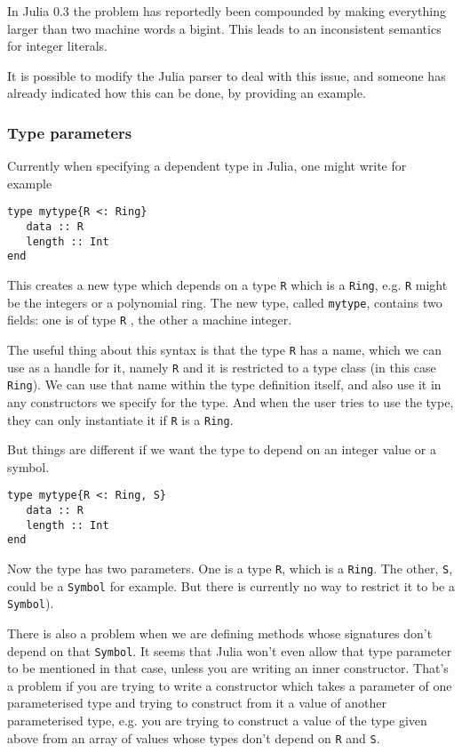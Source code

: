 \documentclass[a4paper,10pt]{article}
\newcommand{\code}{\lstinline}
\begin{document}
In Julia 0.3 the problem has reportedly been compounded by making everything larger than two machine
words a bigint. This leads to an inconsistent semantics for integer literals.

It is possible to modify the Julia parser to deal with this issue, and someone has already indicated
how this can be done, by providing an example.

\subsubsection{Type parameters}

Currently when specifying a dependent type in Julia, one might write for example

\begin{lstlisting}
type mytype{R <: Ring}
   data :: R
   length :: Int
end
\end{lstlisting}

This creates a new type which depends on a type \code{R} which is a \code{Ring}, e.g. \code{R}  might
be the integers or a polynomial ring. The new type, called \code{mytype}, contains two fields: one is
of type \code{R} , the other a machine integer.

The useful thing about this syntax is that the type \code{R}  has a name, which we can use as a handle for
it, namely \code{R} and it is restricted to a type class (in this case \code{Ring}). We can use that name 
within the type definition itself, and also use it in any constructors we specify for the type. And when
the user tries to use the type, they can only instantiate it if \code{R} is a \code{Ring}.

But things are different if we want the type to depend on an integer value or a symbol.

\begin{lstlisting}
type mytype{R <: Ring, S}
   data :: R
   length :: Int
end
\end{lstlisting}

Now the type has two parameters. One is a type \code{R}, which is a \code{Ring}. The other, \code{S}, 
could be a \code{Symbol} for example. But there is currently no way to restrict it to be a 
\code{Symbol}). 

There is also a problem when we are defining methods whose signatures don't depend on that
\code{Symbol}. It seems that Julia won't even allow that type parameter to be mentioned in that case,
unless you are writing an inner constructor. That's a problem if you are trying to write a constructor
which takes a parameter of one parameterised type and trying to construct from it a value of another
parameterised type, e.g. you are trying to construct a value of the type given above from an array of
values whose types don't depend on \code{R} and \code{S}.
\end{document}
